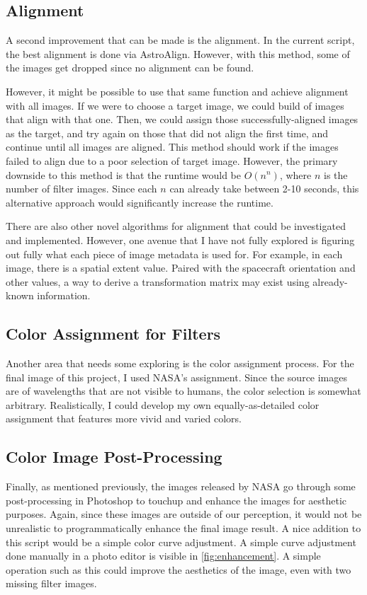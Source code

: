 \documentclass[10pt,twocolumn,letterpaper]{article}
\begin{document}
\subsection{Alignment}

A second improvement that can be made is the alignment. In the current script, the best alignment is done via AstroAlign. However, with this method, some of the images get dropped since no alignment can be found.

However, it might be possible to use that same function and achieve alignment with all images. If we were to choose a target image, we could build of images that align with that one. Then, we could assign those successfully-aligned images as the target, and try again on those that did not align the first time, and continue until all images are aligned. 
This method should work if the images failed to align due to a poor selection of target image. However, the primary downside to this method is that the runtime would be $O(n^n)$, where $n$ is the number of filter images. Since each $n$ can already take between 2-10 seconds, this alternative approach would significantly increase the runtime.

There are also other novel algorithms for alignment that could be investigated and implemented. However, one avenue that I have not fully explored is figuring out fully what each piece of image metadata is used for. For example, in each image, there is a spatial extent value. Paired with the spacecraft orientation and other values, a way to derive a transformation matrix may exist using already-known information.

\subsection{Color Assignment for Filters}

Another area that needs some exploring is the color assignment process. For the final image of this project, I used NASA's assignment. Since the source images are of wavelengths that are not visible to humans, the color selection is somewhat arbitrary. Realistically, I could develop my own equally-as-detailed color assignment that features more vivid and varied colors.

\subsection{Color Image Post-Processing}

Finally, as mentioned previously, the images released by NASA go through some post-processing in Photoshop to touchup and enhance the images for aesthetic purposes. Again, since these images are outside of our perception, it would not be unrealistic to programmatically enhance the final image result. 
A nice addition to this script would be a simple color curve adjustment. A simple curve adjustment done manually in a photo editor is visible in \cref{fig:enhancement}. A simple operation such as this could improve the aesthetics of the image, even with two missing filter images.
\end{document}
